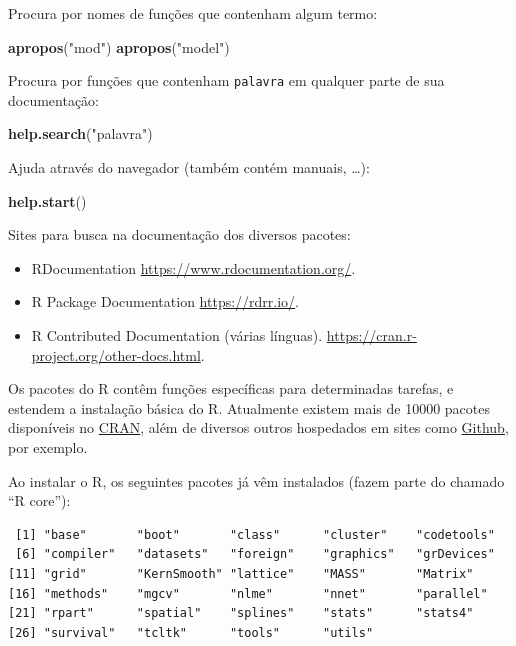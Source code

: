 \documentclass[10pt,a4paper]{book}
\newenvironment{Shaded}{\begin{snugshade}}{\end{snugshade}}
\newcommand{\KeywordTok}[1]{\textcolor[rgb]{0.13,0.29,0.53}{\textbf{#1}}}
\newcommand{\StringTok}[1]{\textcolor[rgb]{0.31,0.60,0.02}{#1}}
\newcommand{\NormalTok}[1]{#1}
\providecommand{\tightlist}{%
  \setlength{\itemsep}{0pt}\setlength{\parskip}{0pt}}
\begin{document}
Procura por nomes de funções que contenham algum termo:

\begin{Shaded}
\begin{Highlighting}[]
\KeywordTok{apropos}\NormalTok{(}\StringTok{"mod"}\NormalTok{)}
\KeywordTok{apropos}\NormalTok{(}\StringTok{"model"}\NormalTok{)}
\end{Highlighting}
\end{Shaded}

Procura por funções que contenham \texttt{palavra} em qualquer parte de
sua documentação:

\begin{Shaded}
\begin{Highlighting}[]
\KeywordTok{help.search}\NormalTok{(}\StringTok{"palavra"}\NormalTok{)}
\end{Highlighting}
\end{Shaded}

Ajuda através do navegador (também contém manuais, \ldots{}):

\begin{Shaded}
\begin{Highlighting}[]
\KeywordTok{help.start}\NormalTok{()}
\end{Highlighting}
\end{Shaded}

Sites para busca na documentação dos diversos pacotes:

\begin{itemize}
\tightlist
\item
  RDocumentation \url{https://www.rdocumentation.org/}.
\item
  R Package Documentation \url{https://rdrr.io/}.
\item
  R Contributed Documentation (várias línguas).
  \url{https://cran.r-project.org/other-docs.html}.
\end{itemize}

Os pacotes do R contêm funções específicas para determinadas tarefas, e
estendem a instalação básica do R. Atualmente existem mais de 10000
pacotes disponíveis no
\href{http://cran-r.c3sl.ufpr.br/web/packages/index.html}{CRAN}, além de
diversos outros hospedados em sites como
\href{https://github.com}{Github}, por exemplo.

Ao instalar o R, os seguintes pacotes já vêm instalados (fazem parte do
chamado ``R core''):

\begin{verbatim}
 [1] "base"       "boot"       "class"      "cluster"    "codetools" 
 [6] "compiler"   "datasets"   "foreign"    "graphics"   "grDevices" 
[11] "grid"       "KernSmooth" "lattice"    "MASS"       "Matrix"    
[16] "methods"    "mgcv"       "nlme"       "nnet"       "parallel"  
[21] "rpart"      "spatial"    "splines"    "stats"      "stats4"    
[26] "survival"   "tcltk"      "tools"      "utils"     
\end{verbatim}
\end{document}
